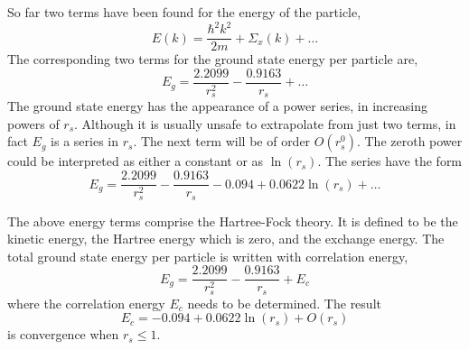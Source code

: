 So far two terms have been found for the energy of the particle,
\begin{equation}
    E(k) = \frac{\hbar^2 k^2}{2m} + \Sigma_x(k) + \dots \label{5.27}
\end{equation}
The corresponding two terms for the ground state energy per particle are,
\begin{equation}
    E_g = \frac{2.2099}{r_s^2} - \frac{0.9163}{r_s} + \dots \label{5.28}
\end{equation}
The ground state energy has the appearance of a power series, in increasing powers of $r_s$.
Although it is usually unsafe to extrapolate from just two terms, in fact $E_g$ is a series in $r_s$.
The next term will be of order $O(r_s^0)$.
The zeroth power could be interpreted as either a constant or as $\ln(r_s)$.
The series have the form
\begin{equation}
    E_g =  \frac{2.2099}{r_s^2} - \frac{0.9163}{r_s} -0.094 + 0.0622\ln(r_s) + \dots \label{5.29}
\end{equation}

The above energy terms comprise the Hartree-Fock theory.
It is defined to be the kinetic energy, the Hartree energy which is zero, and the exchange energy.
The total ground state energy per particle is written with correlation energy,
\begin{equation}
    E_g = \frac{2.2099}{r_s^2} - \frac{0.9163}{r_s} +E_c \label{5.30}
\end{equation}
where the correlation energy $E_c$ needs to be determined.
The result
\begin{equation}
    E_c = -0.094 + 0.0622\ln(r_s) + O(r_s) \label{5.31}
\end{equation}
is convergence when $r_s \leq 1$.


